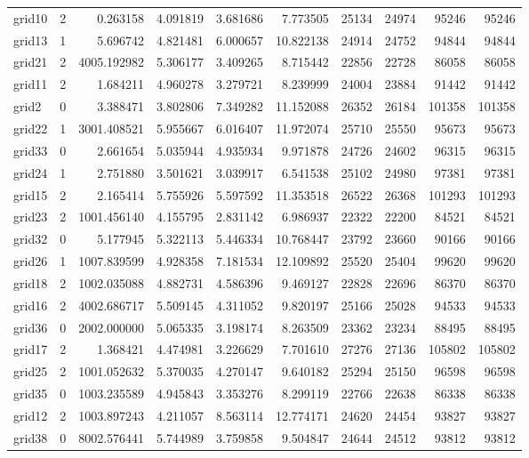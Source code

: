 \begin{longtable}{|l|r|r|r|r|r|r|r|r|r|}
grid10 & 2 & 0.263158 & 4.091819 & 3.681686 & 7.773505 & 25134 & 24974 & 95246 & 95246 \\
grid13 & 1 & 5.696742 & 4.821481 & 6.000657 & 10.822138 & 24914 & 24752 & 94844 & 94844 \\
grid21 & 2 & 4005.192982 & 5.306177 & 3.409265 & 8.715442 & 22856 & 22728 & 86058 & 86058 \\
grid11 & 2 & 1.684211 & 4.960278 & 3.279721 & 8.239999 & 24004 & 23884 & 91442 & 91442 \\
grid2 & 0 & 3.388471 & 3.802806 & 7.349282 & 11.152088 & 26352 & 26184 & 101358 & 101358 \\
grid22 & 1 & 3001.408521 & 5.955667 & 6.016407 & 11.972074 & 25710 & 25550 & 95673 & 95673 \\
grid33 & 0 & 2.661654 & 5.035944 & 4.935934 & 9.971878 & 24726 & 24602 & 96315 & 96315 \\
grid24 & 1 & 2.751880 & 3.501621 & 3.039917 & 6.541538 & 25102 & 24980 & 97381 & 97381 \\
grid15 & 2 & 2.165414 & 5.755926 & 5.597592 & 11.353518 & 26522 & 26368 & 101293 & 101293 \\
grid23 & 2 & 1001.456140 & 4.155795 & 2.831142 & 6.986937 & 22322 & 22200 & 84521 & 84521 \\
grid32 & 0 & 5.177945 & 5.322113 & 5.446334 & 10.768447 & 23792 & 23660 & 90166 & 90166 \\
grid26 & 1 & 1007.839599 & 4.928358 & 7.181534 & 12.109892 & 25520 & 25404 & 99620 & 99620 \\
grid18 & 2 & 1002.035088 & 4.882731 & 4.586396 & 9.469127 & 22828 & 22696 & 86370 & 86370 \\
grid16 & 2 & 4002.686717 & 5.509145 & 4.311052 & 9.820197 & 25166 & 25028 & 94533 & 94533 \\
grid36 & 0 & 2002.000000 & 5.065335 & 3.198174 & 8.263509 & 23362 & 23234 & 88495 & 88495 \\
grid17 & 2 & 1.368421 & 4.474981 & 3.226629 & 7.701610 & 27276 & 27136 & 105802 & 105802 \\
grid25 & 2 & 1001.052632 & 5.370035 & 4.270147 & 9.640182 & 25294 & 25150 & 96598 & 96598 \\
grid35 & 0 & 1003.235589 & 4.945843 & 3.353276 & 8.299119 & 22766 & 22638 & 86338 & 86338 \\
grid12 & 2 & 1003.897243 & 4.211057 & 8.563114 & 12.774171 & 24620 & 24454 & 93827 & 93827 \\
grid38 & 0 & 8002.576441 & 5.744989 & 3.759858 & 9.504847 & 24644 & 24512 & 93812 & 93812 \\

\end{longtable}
